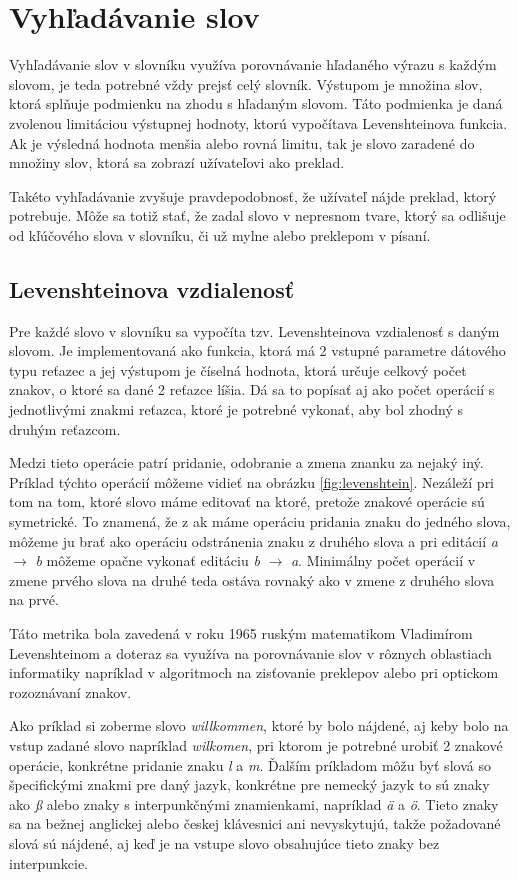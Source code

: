 \documentclass[
  digital, %
  table,   %
  lof,     %
  lot,     %
]{fithesis3}
\begin{document}
\section{Vyhľadávanie slov}
Vyhľadávanie slov v slovníku využíva porovnávanie hľadaného výrazu s každým slovom, je teda potrebné vždy prejsť celý slovník. Výstupom je množina slov, ktorá splňuje podmienku na zhodu s hľadaným slovom. Táto podmienka je daná zvolenou limitáciou výstupnej hodnoty, ktorú vypočítava Levenshteinova funkcia. Ak je výsledná hodnota menšia alebo rovná limitu, tak je slovo zaradené do množiny slov, ktorá sa zobrazí užívateľovi ako preklad.

Takéto vyhľadávanie zvyšuje pravdepodobnosť, že užívateľ nájde preklad, ktorý potrebuje. Môže sa totiž stať, že zadal slovo v nepresnom tvare, ktorý sa odlišuje od kľúčového slova v slovníku, či už mylne alebo preklepom v písaní.


\subsection{Levenshteinova vzdialenosť}
Pre každé slovo v slovníku sa vypočíta tzv. Levenshteinova vzdialenosť s daným slovom. Je implementovaná ako funkcia, ktorá má 2 vstupné parametre dátového typu reťazec a jej výstupom je číselná hodnota, ktorá určuje celkový počet znakov, o ktoré sa dané 2 reťazce líšia. Dá sa to popísať aj ako počet operácií s jednotlivými znakmi reťazca, ktoré je potrebné vykonať, aby bol zhodný s druhým reťazcom.

Medzi tieto operácie patrí pridanie, odobranie a zmena znanku za nejaký iný. Príklad týchto operácií môžeme vidieť na obrázku \ref{fig:levenshtein}. Nezáleží pri tom na tom, ktoré slovo máme editovať na ktoré, pretože znakové operácie sú symetrické. To znamená, že z ak máme operáciu pridania znaku do jedného slova, môžeme ju brať ako operáciu odstránenia znaku z druhého slova a pri editácií \textit{a} $\rightarrow$ \textit{b} môžeme opačne vykonať editáciu \textit{b} $\rightarrow$ \textit{a}. Minimálny počet operácií v zmene prvého slova na druhé teda ostáva rovnaký ako v zmene z druhého slova na prvé.

Táto metrika bola zavedená v roku 1965 ruským matematikom Vladimírom Levenshteinom a doteraz sa využíva na porovnávanie slov v rôznych oblastiach informatiky napríklad v algoritmoch na zisťovanie preklepov alebo pri optickom rozoznávaní znakov.

Ako príklad si zoberme slovo \textit{willkommen}, ktoré by bolo nájdené, aj keby bolo na vstup zadané slovo napríklad \textit{wilkomen}, pri ktorom je potrebné urobiť 2 znakové operácie, konkrétne pridanie znaku \textit{l} a \textit{m}. Ďalším príkladom môžu byť slová so špecifickými znakmi pre daný jazyk, konkrétne pre nemecký jazyk to sú znaky ako \textit{ß} alebo znaky s interpunkčnými znamienkami, napríklad \textit{ä} a \textit{ö}. Tieto znaky sa na bežnej anglickej alebo českej klávesnici ani nevyskytujú, takže požadované slová sú nájdené, aj keď je na vstupe slovo obsahujúce tieto znaky bez interpunkcie.
\end{document}
